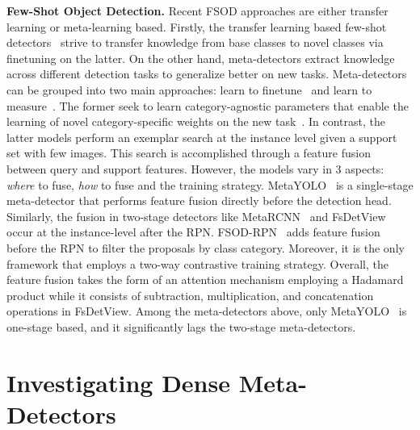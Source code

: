 \documentclass[10pt,twocolumn,letterpaper]{article}
\begin{document}
\begin{table*}[t!]
\end{table*} \textbf{Few-Shot Object Detection.} Recent FSOD approaches are either transfer learning or meta-learning based. Firstly, the transfer learning based few-shot detectors~\cite{LSTD, RepMet, TFA, MPSR, defrcn} strive to transfer knowledge from base classes to novel classes via finetuning on the latter. On the other hand, meta-detectors extract knowledge across different detection tasks to generalize better on new tasks. Meta-detectors can be grouped into two main approaches: learn to finetune~\cite{MetaDet} and learn to measure~\cite{RepMet, FSRW, MetaRCNN, FSOD-RPN, FsDetView, CME, DCNET, DANA, MetaDetR}. The former seek to learn category-agnostic parameters that enable the learning of novel category-specific weights on the new task~\cite{MetaDet}. In contrast, the latter models perform an exemplar search at the instance level given a support set with few images. This search is accomplished through a feature fusion between query and support features. However, the models vary in 3 aspects: \textit{where} to fuse, \textit{how} to fuse and the training strategy. MetaYOLO~\cite{FSRW} is a single-stage meta-detector that performs feature fusion directly before the detection head. Similarly, the fusion in two-stage detectors like MetaRCNN~\cite{MetaRCNN} and FsDetView~\cite{FsDetView} occur at the instance-level after the RPN. FSOD-RPN~\cite{FSOD-RPN} adds feature fusion before the RPN to filter the proposals by class category. Moreover, it is the only framework that employs a two-way contrastive training strategy. Overall, the feature fusion takes the form of an attention mechanism employing a Hadamard product while it consists of subtraction, multiplication, and concatenation operations in FsDetView\cite{FsDetView}. Among the meta-detectors above, only MetaYOLO~\cite{FSRW} is one-stage based, and it significantly lags the two-stage meta-detectors.   


\section{Investigating Dense Meta-Detectors}
\label{sec:investigate}
\end{document}
